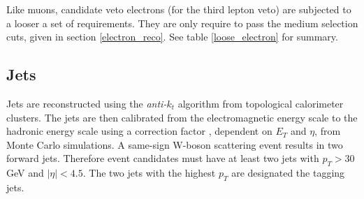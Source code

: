 \begin{table}[h]
	\caption{Veto electron definition}
	\label{loose_electron}
\end{table}

Like muons, candidate veto electrons (for the third lepton veto) are subjected to a looser a set of requirements. They are only require to pass the medium selection cuts, given in section \ref{electron_reco}. See table \ref{loose_electron} for summary.
\subsection{Jets}
Jets are reconstructed using the \emph{anti-$k_{t}$} algorithm from topological calorimeter clusters. The jets are then calibrated from the electromagnetic energy scale to the hadronic energy scale using a correction factor \cite{JetCorrection}, dependent on $E_{T}$ and $\eta$, from Monte Carlo simulations. A same-sign W-boson scattering event results in two forward jets. Therefore event candidates must have at least two jets with $p_{T} > 30$ GeV and $| \eta | < 4.5$. The two jets with the highest $p_{T}$ are designated the tagging jets.
